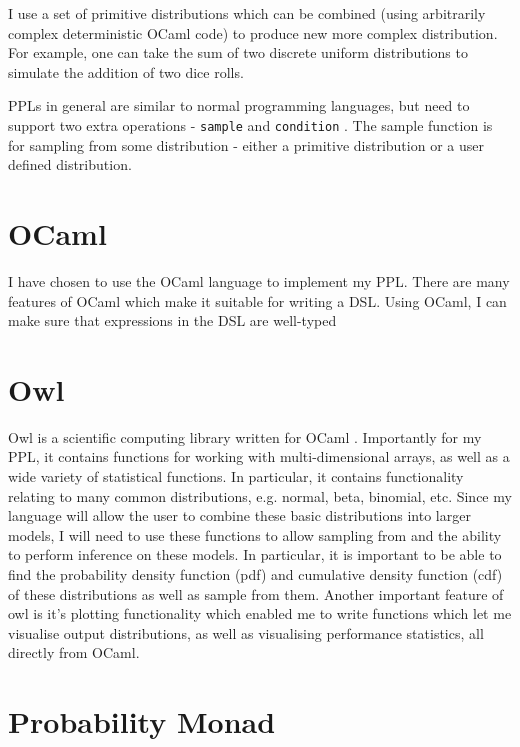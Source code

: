 I use a set of primitive distributions which can be combined (using arbitrarily complex deterministic OCaml code) to produce new more complex distribution. For example, one can take the sum of two discrete uniform distributions to simulate the addition of two dice rolls. 

PPLs in general are similar to normal programming languages, but need to support two extra operations - \texttt{sample} and \texttt{condition} \cite{}. The sample function is for sampling from some distribution - either a primitive distribution or a user defined distribution.

\section{OCaml}
I have chosen to use the OCaml language to implement my PPL. There are many features of OCaml which make it suitable for writing a DSL. Using OCaml, I can make sure that expressions in the DSL are well-typed

\section{Owl}

Owl is a scientific computing library written for OCaml \cite{}. Importantly for my PPL, it contains functions for working with multi-dimensional arrays, as well as a wide variety of statistical functions. In particular, it contains functionality relating to many common distributions, e.g. normal, beta, binomial, etc. Since my language will allow the user to combine these basic distributions into larger models, I will need to use these functions to allow sampling from and the ability to perform inference on these models. In particular, it is important to be able to find the probability density function (pdf) and cumulative density function (cdf) of these distributions as well as sample from them. Another important feature of owl is it's plotting functionality which enabled me to write functions which let me visualise output distributions, as well as visualising performance statistics, all directly from OCaml.

\section{Probability Monad}

